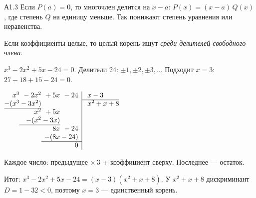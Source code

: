 
\begin{tema}{А1.3}
 Если $P(a)=0$, то многочлен делится на $x-a$:
$P(x)=(x-a)\,Q(x)$, где степень $Q$ на единицу меньше. Так понижают степень
уравнения или неравенства.

 Если коэффициенты целые, то целый корень ищут
\emph{среди делителей свободного члена}.

\begin{primer}
$x^3-2x^2+5x-24=0$. Делители 24: $\pm1,\pm2,\pm3,\dots$ Подходит $x=3$:
$27-18+15-24=0$.
\end{primer}

\begin{minipage}[t]{0.5\linewidth}
\par\smallskip
\small
$\begin{array}{@{}r@{}r@{}r@{}r|l@{}}
x^3 & {}-2x^2 & {}+5x & {}-24 & \;x-3\\ \cline{5-5}
-(x^3 & {}-3x^2) & & & \;x^2+x+8\\ \cline{1-2}
 & x^2 & {}+5x & & \\
 & -(x^2 & {}-3x) & & \\ \cline{2-3}
 & & 8x & {}-24 & \\
 & & -(8x & {}-24) & \\ \cline{3-4}
 & & & 0 &
\end{array}$
\end{minipage}\hfill
\begin{minipage}[t]{0.46\linewidth}
\par\smallskip
\small
{}\par\smallskip
\footnotesize\raggedright Каждое число: предыдущее $\times\,3$ + коэффициент сверху.
Последнее — остаток.
\end{minipage}

\medskip
Итог: $x^3-2x^2+5x-24=(x-3)(x^2+x+8)$. У $x^2+x+8$ дискриминант
$D=1-32<0$, поэтому $x=3$ — единственный корень.
\end{tema}
